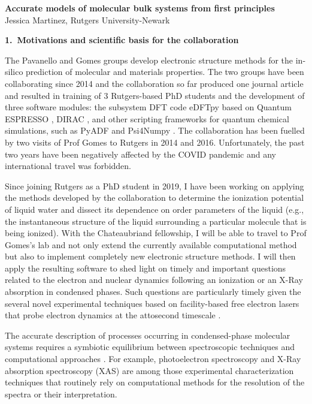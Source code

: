 \documentclass[notitlepage,12pt]{report}
\begin{document}
\renewcommand\Affilfont{\itshape\small}
\begin{center}
    \textbf{\LARGE Accurate models of molecular bulk systems from first principles}\\
    Jessica Martinez, Rutgers University-Newark
\end{center}

\textbf{\large 1.\ Motivations and scientific basis for the collaboration}

    The Pavanello and Gomes groups develop electronic structure methods for the in-silico prediction of molecular and materials properties. The two groups have been collaborating since 2014 and the collaboration so far produced one journal article \supercite{tolle2019charged} and resulted in training of 3 Rutgers-based PhD students and the development of three software modules: the subsystem DFT code eDFTpy\supercite{edftpy} based on Quantum ESPRESSO \supercite{qe}, DIRAC \supercite{saue2020dirac}, and other scripting frameworks for quantum chemical simulations, such as PyADF \supercite{Jacob_2011} and Psi4Numpy \supercite{smith2018psi4numpy}. The collaboration has been fuelled by two visits of Prof Gomes to Rutgers in 2014 and 2016. Unfortunately, the past two years have been negatively affected by the COVID pandemic and any international travel was forbidden. 

    Since joining Rutgers as a PhD student in 2019, I have been working on applying the methods developed by the collaboration to determine the ionization potential of liquid water and dissect its dependence on order parameters of the liquid (e.g., the instantaneous structure of  the liquid surrounding a particular molecule that is being ionized).   With the Chateaubriand fellowship, I will be able to travel to Prof Gomes's lab and not only extend the currently available computational method  but also to implement completely new electronic structure methods. I will then apply the resulting software to shed light on timely and important questions related to the electron and nuclear dynamics following an ionization or an X-Ray absorption in condensed phases. Such questions are particularly timely given the several novel experimental techniques based on facility-based free electron lasers that probe electron dynamics at the attosecond timescale \supercite{Duris_2019}.  

    The accurate description of processes occurring in condensed-phase molecular systems requires a symbiotic  equilibrium between spectroscopic techniques\supercite{reimann2021two,malerz2021low,bolognesi2021combined} and computational approaches \supercite{couto2007understanding,ambrosio2016structural,ozaki2021advances}. For example, photoelectron spectroscopy \supercite{thurmer2021accurate,perry2020ionization,credidio2021quantitative,thurmer2021valence,tolle2019charged,gaiduk2018electron,gaiduk2016photoelectron,seidel2016valence} and X-Ray absorption spectroscopy (XAS)\supercite{zhovtobriukh2019liquid,zhang2020isotope,smith2020femtosecond} are among those experimental characterization techniques that routinely rely on computational methods for the resolution of the spectra or their interpretation.
	
\end{document}

